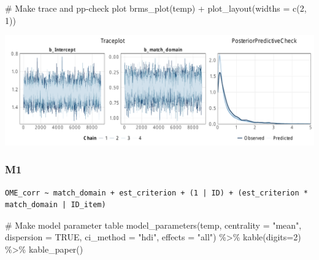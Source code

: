 \documentclass[
  letterpaper,
  DIV=11,
  numbers=noendperiod]{scrartcl}
\newenvironment{Shaded}{\begin{snugshade}}{\end{snugshade}}
\newcommand{\AttributeTok}[1]{\textcolor[rgb]{0.40,0.45,0.13}{#1}}
\newcommand{\CommentTok}[1]{\textcolor[rgb]{0.37,0.37,0.37}{#1}}
\newcommand{\ConstantTok}[1]{\textcolor[rgb]{0.56,0.35,0.01}{#1}}
\newcommand{\DecValTok}[1]{\textcolor[rgb]{0.68,0.00,0.00}{#1}}
\newcommand{\FunctionTok}[1]{\textcolor[rgb]{0.28,0.35,0.67}{#1}}
\newcommand{\NormalTok}[1]{\textcolor[rgb]{0.00,0.23,0.31}{#1}}
\newcommand{\OtherTok}[1]{\textcolor[rgb]{0.00,0.23,0.31}{#1}}
\newcommand{\SpecialCharTok}[1]{\textcolor[rgb]{0.37,0.37,0.37}{#1}}
\newcommand{\StringTok}[1]{\textcolor[rgb]{0.13,0.47,0.30}{#1}}
\begin{document}
\begin{Shaded}
\begin{Highlighting}[]
\CommentTok{\# Make trace and pp{-}check plot}
\FunctionTok{brms\_plot}\NormalTok{(temp) }\SpecialCharTok{+} \FunctionTok{plot\_layout}\NormalTok{(}\AttributeTok{widths =} \FunctionTok{c}\NormalTok{(}\DecValTok{2}\NormalTok{, }\DecValTok{1}\NormalTok{))}
\end{Highlighting}
\end{Shaded}

\includegraphics{supplement_files/figure-pdf/h3aM0-1.pdf}

\subsubsection{M1}\label{m1}

\begin{Shaded}
\end{Shaded}

\begin{verbatim}
OME_corr ~ match_domain + est_criterion + (1 | ID) + (est_criterion * match_domain | ID_item) 
\end{verbatim}

\begin{Shaded}
\begin{Highlighting}[]
\CommentTok{\# Make model parameter table}
\FunctionTok{model\_parameters}\NormalTok{(temp, }\AttributeTok{centrality =} \StringTok{"mean"}\NormalTok{, }\AttributeTok{dispersion =} \ConstantTok{TRUE}\NormalTok{, }
                 \AttributeTok{ci\_method =} \StringTok{"hdi"}\NormalTok{, }\AttributeTok{effects =} \StringTok{"all"}\NormalTok{) }\SpecialCharTok{\%\textgreater{}\%} 
  \FunctionTok{kable}\NormalTok{(}\AttributeTok{digits=}\DecValTok{2}\NormalTok{) }\SpecialCharTok{\%\textgreater{}\%} \FunctionTok{kable\_paper}\NormalTok{()}
\end{Highlighting}
\end{Shaded}
\end{document}
